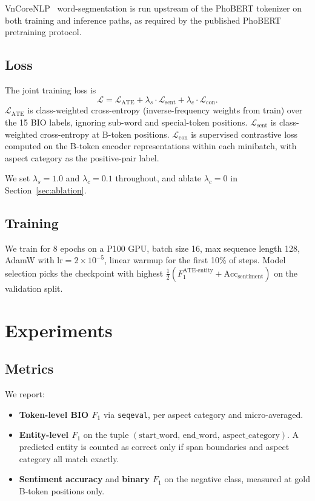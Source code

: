\documentclass[conference]{IEEEtran}
\begin{document}
VnCoreNLP~\cite{vu2018vncorenlp} word-segmentation is run upstream of
the PhoBERT tokenizer on both training and inference paths, as required
by the published PhoBERT pretraining protocol.

\subsection{Loss}

The joint training loss is
\begin{equation}
    \mathcal{L} = \mathcal{L}_{\text{ATE}} + \lambda_s \cdot
                  \mathcal{L}_{\text{sent}} + \lambda_c \cdot
                  \mathcal{L}_{\text{con}}.
\end{equation}
$\mathcal{L}_{\text{ATE}}$ is class-weighted cross-entropy
(inverse-frequency weights from train) over the 15 BIO labels, ignoring
sub-word and special-token positions. $\mathcal{L}_{\text{sent}}$ is
class-weighted cross-entropy at B-token positions.
$\mathcal{L}_{\text{con}}$ is supervised contrastive
loss~\cite{khosla2020supervised} computed on the B-token encoder
representations within each minibatch, with aspect category as the
positive-pair label.

We set $\lambda_s = 1.0$ and $\lambda_c = 0.1$ throughout, and ablate
$\lambda_c = 0$ in Section~\ref{sec:ablation}.

\subsection{Training}

We train for 8 epochs on a P100 GPU, batch size 16, max sequence length
128, AdamW with $\text{lr} = 2 \times 10^{-5}$, linear warmup for the
first 10\% of steps. Model selection picks the checkpoint with highest
$\frac{1}{2}(F_1^{\text{ATE-entity}} + \text{Acc}_{\text{sentiment}})$
on the validation split.

\section{Experiments}\label{sec:experiments}

\subsection{Metrics}

We report:
\begin{itemize}
    \item \textbf{Token-level BIO $F_1$} via \texttt{seqeval}, per aspect
    category and micro-averaged.
    \item \textbf{Entity-level $F_1$} on the tuple
    $(\text{start\_word},\, \text{end\_word},\, \text{aspect\_category})$.
    A predicted entity is counted as correct only if span boundaries and
    aspect category all match exactly.
    \item \textbf{Sentiment accuracy} and \textbf{binary $F_1$} on the
    negative class, measured at gold B-token positions only.
\end{itemize}
\end{document}
